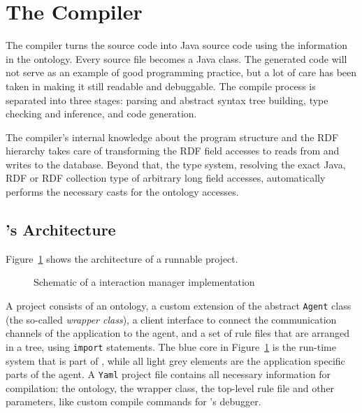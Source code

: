\newcommand{\caret}{{\large\textbf{\textasciicircum}}}

\section{The \vonda Compiler}

The compiler turns the \vonda source code into Java source code using the
information in the ontology. Every source file becomes a Java class. The
generated code will not serve as an example of good programming practice, but a
lot of care has been taken in making it still readable and debuggable. The
compile process is separated into three stages: parsing and abstract syntax
tree building, type checking and inference, and code generation.

The \vonda compiler's internal knowledge about the program structure and the
RDF hierarchy takes care of transforming the RDF field accesses to reads from
and writes to the database. Beyond that, the type system, resolving the exact
Java, RDF or RDF collection type of arbitrary long field accesses,
automatically performs the necessary casts for the ontology accesses.

\subsection{\vonda's Architecture}

Figure~\ref{fig:architecture} shows the architecture of a runnable \vonda project.

\begin{figure}[htbp]
  \centering
  
  \caption{Schematic of a \vonda interaction manager implementation}
  \label{fig:architecture}
\end{figure}

A \vonda project consists of an ontology, a custom extension of the abstract
\texttt{Agent} class (the so-called \emph{wrapper class}), a client interface
to connect the communication channels of the application to the agent, and a
set of rule files that are arranged in a tree, using \texttt{import}
statements. The blue core in Figure~\ref{fig:architecture} is the run-time
system that is part of \vonda, while all light grey elements are the
application specific parts of the agent. A \texttt{Yaml} project file contains
all necessary information for compilation: the ontology, the wrapper class, the
top-level rule file and other parameters, like custom compile commands for
\vonda's debugger.

